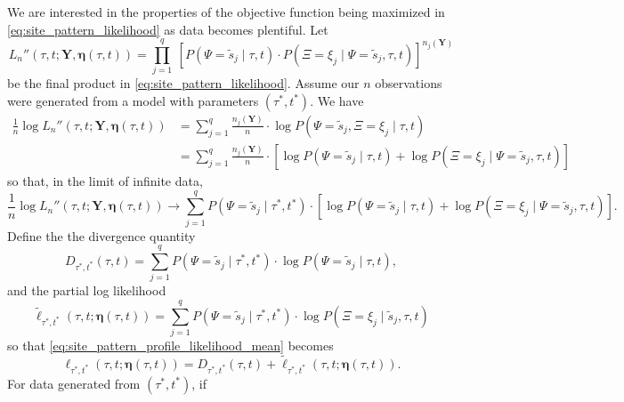 \documentclass[a4paper]{article}
\newcommand{\fullAlignment}{\mathbf{Y}}
\newcommand{\siteSplit}{\tilde{s}}
\newcommand{\fullAncestralSplitPartitions}{\boldsymbol\eta}
\newcommand{\siteSplitRV}{\Psi}
\newcommand{\ancestralSplitRV}{\Xi}
\newcommand{\nCols}{n}
\newcommand{\nSiteSplits}{q}
\newcommand{\shannonDivergence}{D}
\begin{document}
We are interested in the properties of the objective function being maximized in \eqref{eq:site_pattern_likelihood} as data becomes plentiful.
Let
$$
L_\nCols''(\tau, t; \fullAlignment, \fullAncestralSplitPartitions(\tau, t)) = \prod_{j=1}^{\nSiteSplits} \ \left[P(\siteSplitRV=\siteSplit_j \mid \tau, t) \cdot P(\ancestralSplitRV=\xi_j \mid \siteSplitRV=\siteSplit_j, \tau, t)\right] ^{\nCols_j(\fullAlignment)}
$$
be the final product in \eqref{eq:site_pattern_likelihood}.
Assume our $\nCols$ observations were generated from a model with parameters $(\tau^*, t^*)$.
We have
\begin{align}
    \frac{1}{\nCols} \log L_\nCols''(\tau, t; \fullAlignment, \fullAncestralSplitPartitions(\tau,t))
        &= \sum_{j=1}^\nSiteSplits \frac{\nCols_j(\fullAlignment)}{\nCols}\cdot  \log P(\siteSplitRV=\siteSplit_j, \ancestralSplitRV=\xi_j \mid \tau, t) \\
        &= \sum_{j=1}^\nSiteSplits \frac{\nCols_j(\fullAlignment)}{\nCols}\cdot [\log P(\siteSplitRV=\siteSplit_j \mid \tau, t) +
            \log P(\ancestralSplitRV=\xi_j \mid \siteSplitRV=\siteSplit_j , \tau, t)]
\end{align}
so that, in the limit of infinite data,
\begin{equation}
    \frac{1}{\nCols} \log L_\nCols''(\tau, t; \fullAlignment, \fullAncestralSplitPartitions(\tau, t)) \rightarrow \sum_{j=1}^\nSiteSplits P(\siteSplitRV=\siteSplit_j \mid \tau^*, t^*) \cdot [\log P(\siteSplitRV=\siteSplit_j \mid \tau, t) + \log P(\ancestralSplitRV=\xi_j \mid \siteSplitRV=\siteSplit_j , \tau, t)]. \label{eq:site_pattern_profile_likelihood_mean}
\end{equation}
Define the the divergence quantity
$$
\shannonDivergence_{\tau^*,t^*}(\tau,t) = \sum_{j=1}^\nSiteSplits P(\siteSplitRV=\siteSplit_j \mid \tau^*, t^*)\cdot\log P(\siteSplitRV=\siteSplit_j \mid \tau, t),
$$
and the partial log likelihood
$$
\tilde{\ell}_{\tau^*,t^*}(\tau, t; \fullAncestralSplitPartitions(\tau,t)) = \sum_{j=1}^\nSiteSplits P(\siteSplitRV=\siteSplit_j \mid \tau^*, t^*)\cdot\log P(\ancestralSplitRV=\xi_j \mid \siteSplit_j, \tau, t)
$$
so that \eqref{eq:site_pattern_profile_likelihood_mean} becomes
\begin{equation}
    \label{eq:log_likelihood_simplified}
    \ell_{\tau^*,t^*}(\tau, t; \fullAncestralSplitPartitions(\tau,t)) = \shannonDivergence_{\tau^*,t^*}(\tau,t) + \tilde{\ell}_{\tau^*,t^*}(\tau, t; \fullAncestralSplitPartitions(\tau,t)).
\end{equation}
For data generated from $(\tau^*, t^*)$, if
\end{document}
